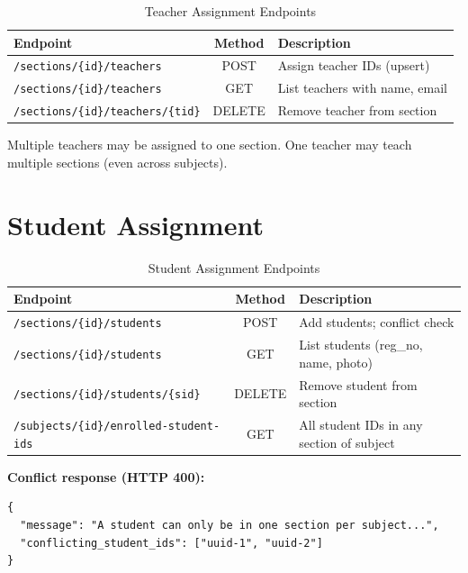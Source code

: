\documentclass[11pt,a4paper,oneside]{report}
\begin{document}
\begin{table}[H]
  \centering
  \caption{Teacher Assignment Endpoints}
  \begin{tabular}{@{}p{5.5cm}cp{4.5cm}@{}}
    \toprule
    \textbf{Endpoint} & \textbf{Method} & \textbf{Description} \\
    \midrule
    \texttt{/sections/\{id\}/teachers} & POST & Assign teacher IDs (upsert) \\
    \texttt{/sections/\{id\}/teachers} & GET & List teachers with name, email \\
    \texttt{/sections/\{id\}/teachers/\{tid\}} & DELETE & Remove teacher from section \\
    \bottomrule
  \end{tabular}
\end{table}

Multiple teachers may be assigned to one section. One teacher may teach multiple sections (even across subjects).

\section{Student Assignment}

\begin{table}[H]
  \centering
  \caption{Student Assignment Endpoints}
  \begin{tabular}{@{}p{5.5cm}cp{4.5cm}@{}}
    \toprule
    \textbf{Endpoint} & \textbf{Method} & \textbf{Description} \\
    \midrule
    \texttt{/sections/\{id\}/students} & POST & Add students; conflict check \\
    \texttt{/sections/\{id\}/students} & GET & List students (reg\_no, name, photo) \\
    \texttt{/sections/\{id\}/students/\{sid\}} & DELETE & Remove student from section \\
    \texttt{/subjects/\{id\}/enrolled-student-ids} & GET & All student IDs in any section of subject \\
    \bottomrule
  \end{tabular}
\end{table}

\textbf{Conflict response (HTTP 400):}
\begin{lstlisting}[caption={Example error payload}]
{
  "message": "A student can only be in one section per subject...",
  "conflicting_student_ids": ["uuid-1", "uuid-2"]
}
\end{lstlisting}
\end{document}
